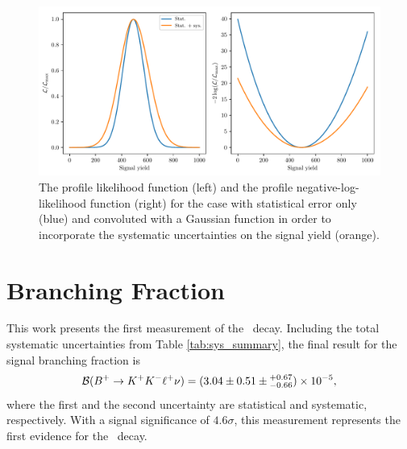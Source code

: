 \begin{figure}[H]
	\centering
	\captionsetup{width=0.8\linewidth}
	\includegraphics[width=\linewidth]{fig/significance}
	\caption{The profile likelihood function (left) and the profile negative-log-likelihood function (right) for the case with statistical error only (blue) and convoluted with a Gaussian function in order to incorporate the systematic uncertainties on the signal yield (orange).}
	\label{fig:significance}
\end{figure}


\section{Branching Fraction}

This work presents the first measurement of the \decayb~decay. Including the total systematic uncertainties from Table \ref{tab:sys_summary}, the final result for the signal branching fraction is
\begin{equation}
\mathcal{B}(B^+ \to K^+ K^- \ell^+ \nu) = (3.04 \pm 0.51 \pm {}^{+0.67}_{-0.66})\times 10^{-5},
\end{equation}
where the first and the second uncertainty are statistical and systematic, respectively. With a signal significance of $4.6\sigma$, this measurement represents the first evidence for the \decayb~decay.

